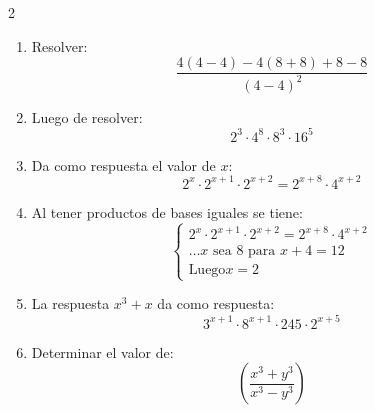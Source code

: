\documentclass[10pt]{article}
\begin{document}
\begin{multicols}{2}
\begin{enumerate}[label=\textbf{\arabic*.}, itemsep=0.4cm]
		\item Resolver:
		      $$
			      \frac{4(4 - 4) - 4(8 + 8) + 8 - 8}{(4 - 4)^2}
		      $$

		\item Luego de resolver:
		      $$
			      2^3 \cdot 4^8 \cdot 8^3 \cdot 16^5
		      $$

		\item Da como respuesta el valor de $x$:
		      $$
			      2^{x} \cdot 2^{x+1} \cdot 2^{x+2} = 2^{x+8} \cdot 4^{x+2}
		      $$

		\item Al tener productos de bases iguales se tiene:
		      $$
			      \begin{cases}
				      2^{x} \cdot 2^{x+1} \cdot 2^{x+2} = 2^{x+8} \cdot 4^{x+2} \\
				      \ldots x \text{ sea } 8 \text{ para } x + 4 = 12          \\
				      \text{Luego} x = 2
			      \end{cases}
		      $$

		\item La respuesta $x^3 + x$ da como respuesta:
		      $$
			      3^{x+1} \cdot 8^{x+1} \cdot 245 \cdot 2^{x+5}
		      $$

		\item Determinar el valor de:
		      $$
			      \left( \frac{x^3 + y^3}{x^3 - y^3} \right)
		      $$



	\end{enumerate}

\end{multicols}
\end{document}
